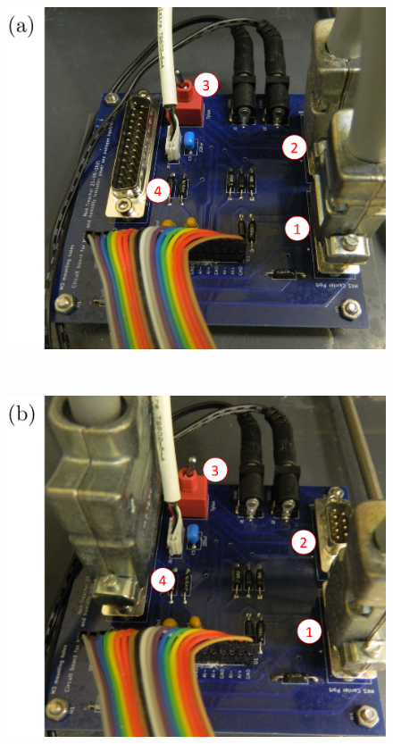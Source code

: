 \documentclass[
  a4paper,
]{scrbook}
\begin{document}
\begin{figure}

\begin{minipage}[t]{0.49\linewidth}

{\centering 

\includegraphics{figures/ch5/low_flow_config_edited.png} {}

}

\end{minipage}%
%
\begin{minipage}[t]{0.03\linewidth}

{\centering 

~

}

\end{minipage}%
%
\begin{minipage}[t]{0.49\linewidth}

{\centering 

\includegraphics{figures/ch5/high_flow_config_edited.png} {}

}
\end{minipage}
\end{figure}
\end{document}
